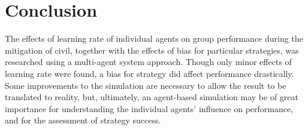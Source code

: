 \section{Conclusion}
The effects of learning rate of individual agents on group performance during the mitigation of civil, together with the effects of bias for particular strategies, was researched using a multi-agent system approach. Though only minor effects of learning rate were found, a bias for strategy did affect performance drastically. Some improvements to the simulation are necessary to allow the result to be translated to reality, but, ultimately, an agent-based simulation may be of great importance for understanding the individual agents' influence on performance, and for the assessment of strategy success. 